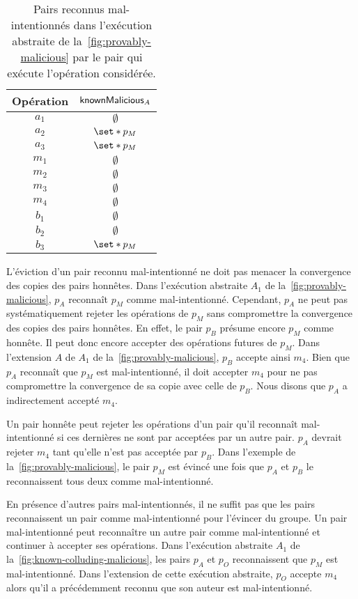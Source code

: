 \begin{table}[htb]
    \centering
    \begin{tabular}{cc}
        Opération & $\operatorname{\mathsf{knownMalicious}}_A$ \\
        \toprule
        $a_1$ & $\emptyset$ \\
        $a_2$ & $\set*{p_M}$ \\
        $a_3$ & $\set*{p_M}$ \\
        $m_1$ & $\emptyset$ \\
        $m_2$ & $\emptyset$ \\
        $m_3$ & $\emptyset$ \\
        $m_4$ & $\emptyset$ \\
        $b_1$ & $\emptyset$ \\
        $b_2$ & $\emptyset$ \\
        $b_3$ & $\set*{p_M}$ \\
    \end{tabular}
    \caption{Pairs reconnus mal-intentionnés dans l'exécution abstraite de la~\autoref{fig:provably-malicious} par le pair qui exécute l'opération considérée.}\label{tab:known-malicious}
\end{table}

L'éviction d'un pair reconnu mal-intentionné ne doit pas menacer la convergence des copies des pairs honnêtes.
Dans l'exécution abstraite $A_1$ de la~\autoref{fig:provably-malicious}, $p_A$ reconnaît $p_M$ comme mal-intentionné.
Cependant, $p_A$ ne peut pas systématiquement rejeter les opérations de $p_M$ sans compromettre la convergence des copies des pairs honnêtes.
En effet, le pair $p_B$ présume encore $p_M$ comme honnête.
Il peut donc encore accepter des opérations futures de $p_M$.
Dans l'extension $A$ de $A_1$ de la~\autoref{fig:provably-malicious}, $p_B$ accepte ainsi $m_4$.
Bien que $p_A$ reconnaît que $p_M$ est mal-intentionné, il doit accepter $m_4$ pour ne pas compromettre la convergence de sa copie avec celle de $p_B$.
Nous disons que $p_A$ a indirectement accepté $m_4$.

Un pair honnête peut rejeter les opérations d'un pair qu'il reconnaît mal-intentionné si ces dernières ne sont par acceptées par un autre pair.
$p_A$ devrait rejeter $m_4$ tant qu'elle n'est pas acceptée par $p_B$.
Dans l'exemple de la~\autoref{fig:provably-malicious}, le pair $p_M$ est évincé une fois que $p_A$ et $p_B$ le reconnaissent tous deux comme mal-intentionné.

En présence d'autres pairs mal-intentionnés, il ne suffit pas que les pairs reconnaissent un pair comme mal-intentionné pour l'évincer du groupe.
Un pair mal-intentionné peut reconnaître un autre pair comme mal-intentionné et continuer à accepter ses opérations.
Dans l'exécution abstraite $A_1$ de la~\autoref{fig:known-colluding-malicious}, les pairs $p_A$ et $p_O$ reconnaissent que $p_M$ est mal-intentionné.
Dans l'extension de cette exécution abstraite, $p_O$ accepte $m_4$ alors qu'il a précédemment reconnu que son auteur est mal-intentionné.

